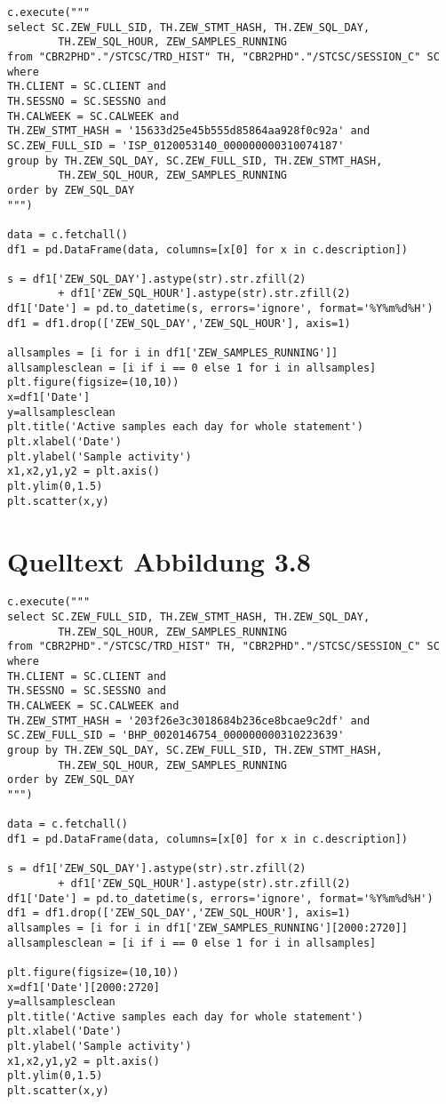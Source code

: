 \begin{lstlisting}[caption={\texttt{Quelltext Abbildung 3.6}},captionpos=b]
c.execute("""
select SC.ZEW_FULL_SID, TH.ZEW_STMT_HASH, TH.ZEW_SQL_DAY, 
		TH.ZEW_SQL_HOUR, ZEW_SAMPLES_RUNNING
from "CBR2PHD"."/STCSC/TRD_HIST" TH, "CBR2PHD"."/STCSC/SESSION_C" SC
where
TH.CLIENT = SC.CLIENT and
TH.SESSNO = SC.SESSNO and
TH.CALWEEK = SC.CALWEEK and
TH.ZEW_STMT_HASH = '15633d25e45b555d85864aa928f0c92a' and
SC.ZEW_FULL_SID = 'ISP_0120053140_000000000310074187'
group by TH.ZEW_SQL_DAY, SC.ZEW_FULL_SID, TH.ZEW_STMT_HASH, 
		TH.ZEW_SQL_HOUR, ZEW_SAMPLES_RUNNING
order by ZEW_SQL_DAY
""")

data = c.fetchall()
df1 = pd.DataFrame(data, columns=[x[0] for x in c.description])

s = df1['ZEW_SQL_DAY'].astype(str).str.zfill(2) 
		+ df1['ZEW_SQL_HOUR'].astype(str).str.zfill(2)
df1['Date'] = pd.to_datetime(s, errors='ignore', format='%Y%m%d%H')
df1 = df1.drop(['ZEW_SQL_DAY','ZEW_SQL_HOUR'], axis=1)

allsamples = [i for i in df1['ZEW_SAMPLES_RUNNING']]
allsamplesclean = [i if i == 0 else 1 for i in allsamples]
plt.figure(figsize=(10,10))
x=df1['Date']
y=allsamplesclean
plt.title('Active samples each day for whole statement')
plt.xlabel('Date')
plt.ylabel('Sample activity')
x1,x2,y1,y2 = plt.axis()  
plt.ylim(0,1.5)
plt.scatter(x,y)
\end{lstlisting}

\section{Quelltext Abbildung 3.8}

\begin{lstlisting}[caption={\texttt{Quelltext Abbildung 3.8}},captionpos=b]
c.execute("""
select SC.ZEW_FULL_SID, TH.ZEW_STMT_HASH, TH.ZEW_SQL_DAY, 
		TH.ZEW_SQL_HOUR, ZEW_SAMPLES_RUNNING
from "CBR2PHD"."/STCSC/TRD_HIST" TH, "CBR2PHD"."/STCSC/SESSION_C" SC
where
TH.CLIENT = SC.CLIENT and
TH.SESSNO = SC.SESSNO and
TH.CALWEEK = SC.CALWEEK and
TH.ZEW_STMT_HASH = '203f26e3c3018684b236ce8bcae9c2df' and
SC.ZEW_FULL_SID = 'BHP_0020146754_000000000310223639'
group by TH.ZEW_SQL_DAY, SC.ZEW_FULL_SID, TH.ZEW_STMT_HASH, 
		TH.ZEW_SQL_HOUR, ZEW_SAMPLES_RUNNING
order by ZEW_SQL_DAY
""")

data = c.fetchall()
df1 = pd.DataFrame(data, columns=[x[0] for x in c.description])

s = df1['ZEW_SQL_DAY'].astype(str).str.zfill(2) 
		+ df1['ZEW_SQL_HOUR'].astype(str).str.zfill(2)
df1['Date'] = pd.to_datetime(s, errors='ignore', format='%Y%m%d%H')
df1 = df1.drop(['ZEW_SQL_DAY','ZEW_SQL_HOUR'], axis=1)
allsamples = [i for i in df1['ZEW_SAMPLES_RUNNING'][2000:2720]]
allsamplesclean = [i if i == 0 else 1 for i in allsamples]

plt.figure(figsize=(10,10))
x=df1['Date'][2000:2720]
y=allsamplesclean
plt.title('Active samples each day for whole statement')
plt.xlabel('Date')
plt.ylabel('Sample activity')
x1,x2,y1,y2 = plt.axis()  
plt.ylim(0,1.5)
plt.scatter(x,y)
\end{lstlisting}

